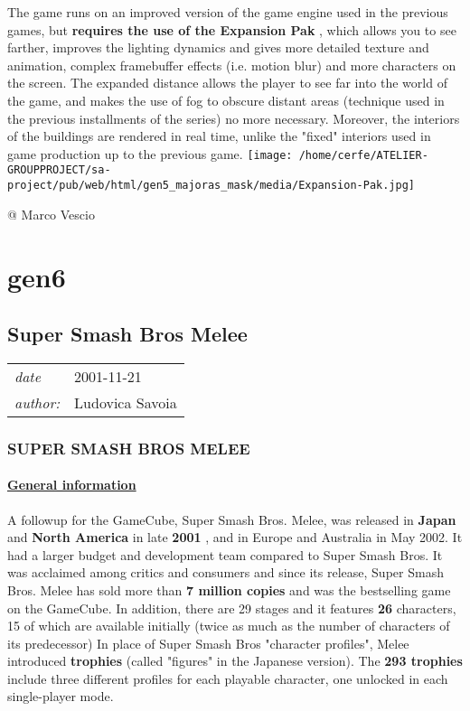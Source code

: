 \documentclass[a4paper,10pt]{book}
\newcommand{\pageHeader}[4]{
    \section{#1}
    \vspace{-0.3cm}
    \begin{table}[h!]
     \begin{tabular}{ll}
        \hline
        \textit{date} & #2 \\
        \textit{author: } & #3\\
        \hline
     \end{tabular}
    \end{table}
    \vspace{-0.3cm}
}
\begin{document}
          The game runs on an improved version of the game engine used in the previous games, but  \textbf{requires the use of the Expansion Pak } , which allows you to see farther, improves the lighting dynamics
          and gives more detailed texture and animation, complex framebuffer effects (i.e. motion blur) and more characters on the screen. The expanded distance allows the player to see far into the world of the
          game, and makes the use of fog to obscure distant areas (technique used in the previous installments of the series) no more necessary. Moreover, the interiors of the buildings are rendered in real time, unlike the
          "fixed" interiors used in game production up to the previous game. 
 \texttt{[image: /home/cerfe/ATELIER-GROUPPROJECT/sa-project/pub/web/html/gen5\_majoras\_mask/media/Expansion-Pak.jpg]}
 
 
 @ Marco Vescio 
 
 \newpage\chapter{gen6}\newpage\pageHeader{Super Smash Bros Melee}{2001-11-21}{Ludovica Savoia}{One of the best Super Mario Games}
 \subsection{SUPER SMASH BROS MELEE }
 \subsubsection{\underline{General information }}
 
          A followup for the GameCube, Super Smash Bros. Melee, was released in  \textbf{Japan }  and  \textbf{North America }  in late  \textbf{2001 } , and in
          Europe and Australia in May 2002. It had a larger budget and development team compared to Super Smash Bros. It was acclaimed among critics and consumers and since its release, Super Smash Bros. Melee
          has sold more than  \textbf{7 million copies }  and was the bestselling game on the GameCube. In addition, there are 29 stages and it features  \textbf{26 }  characters, 15 of which are available initially (twice as much as the number of characters of its
          predecessor)  
          In place of Super Smash Bros "character profiles", Melee introduced  \textbf{trophies }  (called "figures" in the Japanese version).
          The  \textbf{293 trophies }  include three different profiles for each playable character, one unlocked in each single-player mode.
         
\end{document}
